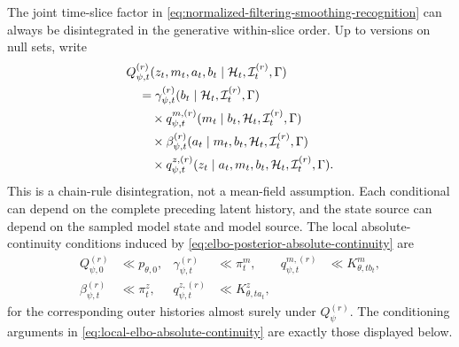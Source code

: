 The joint time-slice factor in \cref{eq:normalized-filtering-smoothing-recognition} can always be disintegrated in the generative within-slice order. Up to versions on null sets, write
\begin{equation}
\begin{aligned}
&Q_{\psi,t}^{(r)}
(z_t,m_t,a_t,b_t\mid
\mathcal H_t,\mathcal I_t^{(r)},\Gamma)\\
&\quad=
\gamma_{\psi,t}^{(r)}
(b_t\mid\mathcal H_t,\mathcal I_t^{(r)},\Gamma)\\
&\qquad\times
q_{\psi,t}^{m,(r)}
(m_t\mid b_t,\mathcal H_t,\mathcal I_t^{(r)},\Gamma)\\
&\qquad\times
\beta_{\psi,t}^{(r)}
(a_t\mid m_t,b_t,\mathcal H_t,\mathcal I_t^{(r)},\Gamma)\\
&\qquad\times
q_{\psi,t}^{z,(r)}
(z_t\mid a_t,m_t,b_t,\mathcal H_t,
\mathcal I_t^{(r)},\Gamma).
\end{aligned}
\label{eq:structured-slice-disintegration}
\end{equation}
This is a chain-rule disintegration, not a mean-field assumption. Each conditional can depend on the complete preceding latent history, and the state source can depend on the sampled model state and model source. The local absolute-continuity conditions induced by \cref{eq:elbo-posterior-absolute-continuity} are
\begin{equation}
\begin{aligned}
Q_{\psi,0}^{(r)}&\ll p_{\theta,0},
&\gamma_{\psi,t}^{(r)}&\ll\pi_t^m,
&q_{\psi,t}^{m,(r)}&\ll K^m_{\theta,tb_t},\\
\beta_{\psi,t}^{(r)}&\ll\pi_t^z,
&q_{\psi,t}^{z,(r)}&\ll K^z_{\theta,ta_t},
\end{aligned}
\label{eq:local-elbo-absolute-continuity}
\end{equation}
for the corresponding outer histories almost surely under $Q_\psi^{(r)}$. The conditioning arguments in \cref{eq:local-elbo-absolute-continuity} are exactly those displayed below.


